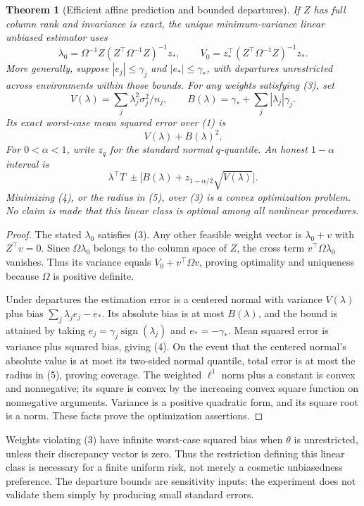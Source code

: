 \documentclass[11pt,a4paper]{article}
\newtheorem{theorem}{Theorem}[section]
\theoremstyle{remark}
\begin{document}
\begin{theorem}[Efficient affine prediction and bounded departures]
If $Z$ has full column rank and invariance is exact, the unique minimum-variance linear unbiased estimator uses
\[
 \lambda_0=\Omega^{-1}Z(Z^\top\Omega^{-1}Z)^{-1}z_*,
 \qquad V_0=z_*^\top(Z^\top\Omega^{-1}Z)^{-1}z_*.
\]
More generally, suppose $|e_j|\le\gamma_j$ and $|e_*|\le\gamma_*$, with departures unrestricted across environments within those bounds. For any weights satisfying (3), set
\[
 V(\lambda)=\sum_j\lambda_j^2\sigma_j^2/n_j,
 \qquad B(\lambda)=\gamma_*+\sum_j|\lambda_j|\gamma_j.
\]
Its exact worst-case mean squared error over (1) is
\[
 V(\lambda)+B(\lambda)^2. \tag{4}
\]
For $0<\alpha<1$, write $z_q$ for the standard normal $q$-quantile. An honest $1-\alpha$ interval is
\[
 \lambda^\top T\ \pm\bigl[B(\lambda)+z_{1-\alpha/2}\sqrt{V(\lambda)}\bigr]. \tag{5}
\]
Minimizing (4), or the radius in (5), over (3) is a convex optimization problem. No claim is made that this linear class is optimal among all nonlinear procedures.
\end{theorem}
\begin{proof}
The stated $\lambda_0$ satisfies (3). Any other feasible weight vector is $\lambda_0+v$ with $Z^\top v=0$. Since $\Omega\lambda_0$ belongs to the column space of $Z$, the cross term $v^\top\Omega\lambda_0$ vanishes. Thus its variance equals $V_0+v^\top\Omega v$, proving optimality and uniqueness because $\Omega$ is positive definite.

Under departures the estimation error is a centered normal with variance $V(\lambda)$ plus bias $\sum_j\lambda_j e_j-e_*$. Its absolute bias is at most $B(\lambda)$, and the bound is attained by taking $e_j=\gamma_j\operatorname{sign}(\lambda_j)$ and $e_*=-\gamma_*$. Mean squared error is variance plus squared bias, giving (4). On the event that the centered normal's absolute value is at most its two-sided normal quantile, total error is at most the radius in (5), proving coverage. The weighted $\ell^1$ norm plus a constant is convex and nonnegative; its square is convex by the increasing convex square function on nonnegative arguments. Variance is a positive quadratic form, and its square root is a norm. These facts prove the optimization assertions.
\end{proof}
Weights violating (3) have infinite worst-case squared bias when $\theta$ is unrestricted, unless their discrepancy vector is zero. Thus the restriction defining this linear class is necessary for a finite uniform risk, not merely a cosmetic unbiasedness preference. The departure bounds are sensitivity inputs: the experiment does not validate them simply by producing small standard errors.
\end{document}
